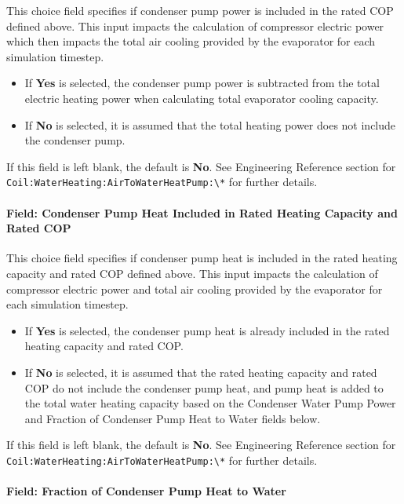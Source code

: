 This choice field specifies if condenser pump power is included in the rated COP defined above.
This input impacts the calculation of compressor electric power which then impacts the total air cooling provided by the evaporator for each simulation timestep.

\begin{itemize}
\item
    If \textbf{Yes} is selected, the condenser pump power is subtracted from the total electric heating power when calculating total evaporator cooling capacity.
\item
    If \textbf{No} is selected, it is assumed that the total heating power does not include the condenser pump.
\end{itemize}

If this field is left blank, the default is \textbf{No}. See Engineering Reference section for \lstinline!Coil:WaterHeating:AirToWaterHeatPump:\*! for further details.


\paragraph{Field: Condenser Pump Heat Included in Rated Heating Capacity and Rated COP}\label{vshpwhheating-condenser-pump-heat-included-in-rated-heating-capacity-and-rated-cop}

This choice field specifies if condenser pump heat is included in the rated heating capacity and rated COP defined above.
This input impacts the calculation of compressor electric power and total air cooling provided by the evaporator for each simulation timestep.
\begin{itemize}
\item
    If \textbf{Yes} is selected, the condenser pump heat is already included in the rated heating capacity and rated COP.
\item
    If \textbf{No} is selected, it is assumed that the rated heating capacity and rated COP do not include the condenser pump heat,
    and pump heat is added to the total water heating capacity based on the Condenser Water Pump Power and Fraction of Condenser Pump Heat to Water fields below.
\end{itemize}

If this field is left blank, the default is \textbf{No}. See Engineering Reference section for \lstinline!Coil:WaterHeating:AirToWaterHeatPump:\*! for further details.


\paragraph{Field: Fraction of Condenser Pump Heat to Water}\label{vshpwhheating-fraction-of-condenser-pump-heat-to-water}

